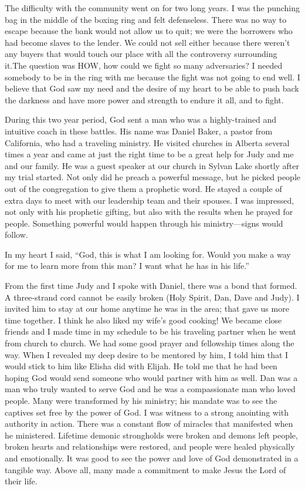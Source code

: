 \documentclass[twoside, 12pt]{book}
\begin{document}
 The difficulty with the community went on for two long years. I was the punching bag in the middle of the boxing ring and felt defenseless. There was no way to escape because the bank would not allow us to quit; we were the borrowers who had become slaves to the lender. We could not sell either because there weren’t any buyers that would touch our place with all the controversy surrounding it.The question was HOW, how could we fight so many adversaries? I needed somebody to be in the ring with me because the fight was not going to end well. I believe that God saw my need and the desire of my heart to be able to push back the darkness and have more power and strength to endure it all, and to fight.

During this two year period, God sent a man who was a highly-trained and intuitive coach in these battles. His name was Daniel Baker, a pastor from California, who had a traveling ministry. He visited churches in Alberta several times a year and came at just the right time to be a great help for Judy and me and our family. He was a guest speaker at our church in Sylvan Lake shortly after my trial started. Not only did he preach a powerful message, but he picked people out of the congregation to give them a prophetic word. He stayed a couple of extra days to meet with our leadership team and their spouses. I was impressed, not only with his prophetic gifting, but also with the results when he prayed for people. Something powerful would happen through his ministry—signs would follow.

In my heart I said, “God, this is what I am looking for. Would you make a way for me to learn more from this man? I want what he has in his life.”

From the first time Judy and I spoke with Daniel, there was a bond that formed. A three-strand cord cannot be easily broken (Holy Spirit, Dan, Dave and Judy). I invited him to stay at our home anytime he was in the area; that gave us more time together. I think he also liked my wife’s good cooking! We became close friends and I made time in my schedule to be his traveling partner when he went from church to church.
We had some good prayer and fellowship times along the way. When I revealed my deep desire to be mentored by him, I told him that I would stick to him like Elisha did with Elijah. He told me that he had been hoping God would send someone who would partner with him as well. Dan was a man who truly wanted to serve God and he was a compassionate man who loved people. Many were transformed by his ministry; his mandate was to see the captives set free by the power of God. I was witness to a strong anointing with authority in action. There was a constant flow of miracles that manifested when he ministered. Lifetime demonic strongholds were broken and demons left people, broken hearts and relationships were restored, and people were healed physically and emotionally. It was good to see the power and love of God demonstrated in a tangible way. Above all, many made a commitment to make Jesus the Lord of their life.
\end{document}

